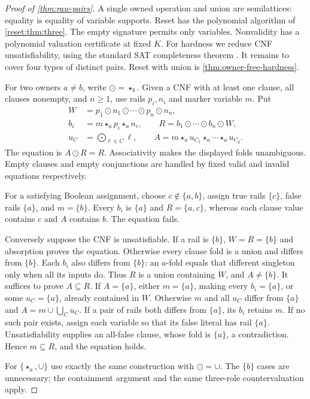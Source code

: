 \begin{proof}[Proof of \cref{thm:raw-pairs}]
A single owned operation and union are semilattices: equality is equality
of variable supports. Reset has the polynomial algorithm of
\cref{reset:thm:three}. The empty signature permits only variables.
Nonvalidity has a polynomial valuation certificate at fixed $K$.
For hardness we reduce CNF unsatisfiability, using the standard
SAT completeness theorem \cite{Cook1971}.
It remains to cover four types of distinct pairs. Reset with union is
\cref{thm:owner-free-hardness}.

For two owners $a\ne b$, write $\odot=\star_b$. Given a CNF with at
least one clause, all clauses nonempty, and $n\geq1$, use rails
$p_i,n_i$ and marker variable $m$. Put
\begin{align*}
 W&=p_1\odot n_1\odot\cdots\odot p_n\odot n_n,\\
 b_i&=m\star_a p_i\star_a n_i,\qquad
 R=b_1\odot\cdots\odot b_n\odot W,\\
 u_C&=\mathop{\bigodot}_{\ell\in C}\ell,\qquad
 A=m\star_a u_{C_1}\star_a\cdots\star_a u_{C_q}.
\end{align*}
The equation is $A\odot R=R$. Associativity makes the displayed folds
unambiguous. Empty clauses and empty conjunctions are handled by fixed
valid and invalid equations respectively.

For a satisfying Boolean assignment, choose $c\notin\{a,b\}$, assign
true rails $\{c\}$, false rails $\{a\}$, and $m=\{b\}$.
Every $b_i$ is $\{a\}$ and $R=\{a,c\}$, whereas each clause value
contains $c$ and $A$ contains $b$. The equation fails.

Conversely suppose the CNF is unsatisfiable. If a rail is $\{b\}$,
$W=R=\{b\}$ and absorption proves the equation. Otherwise every
clause fold is a union and differs from $\{b\}$. Each $b_i$ also
differs from $\{b\}$: an $a$-fold equals that different singleton only
when all its inputs do. Thus $R$ is a union containing $W$, and
$A\ne\{b\}$. It suffices to prove $A\subseteq R$.
If $A=\{a\}$, either $m=\{a\}$, making every $b_i=\{a\}$, or
some $u_C=\{a\}$, already contained in $W$. Otherwise $m$ and all
$u_C$ differ from $\{a\}$ and $A=m\cup\bigcup_C u_C$.
If a pair of rails both differs from $\{a\}$, its $b_i$ retains $m$.
If no such pair exists, assign each variable so that its false literal
has rail $\{a\}$. Unsatisfiability supplies an all-false clause,
whose fold is $\{a\}$, a contradiction. Hence $m\subseteq R$,
and the equation holds.

For $\{\star_a,\cup\}$ use exactly the same construction with
$\odot=\cup$. The $\{b\}$ cases are unnecessary; the containment
argument and the same three-role countervaluation apply.


\end{proof}
